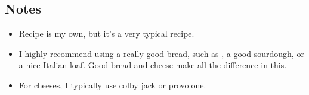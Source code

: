 \begin{multicols}{2}
\subsection*{Notes}
\begin{itemize}
    \item Recipe is my own, but it's a very typical recipe.
    \item I highly recommend using a really good bread, such as , a good sourdough, or a nice Italian loaf. Good bread and cheese make all the difference in this.
    \item For cheeses, I typically use colby jack or provolone.
\end{itemize}
\end{multicols}
\clearpage